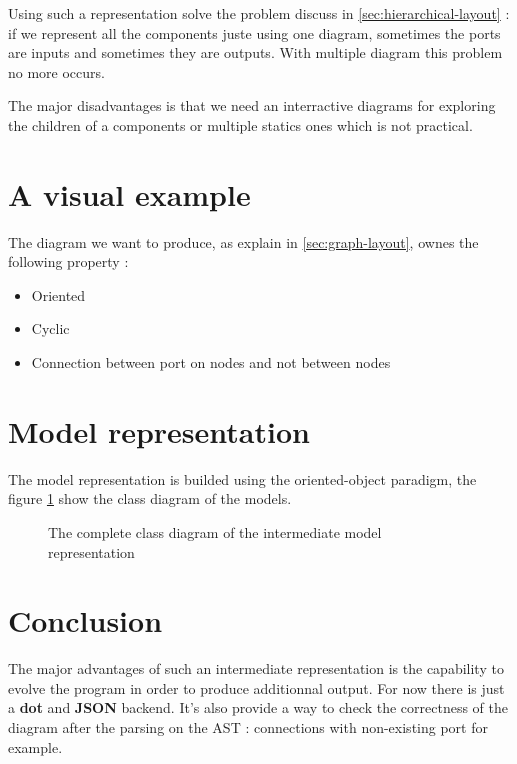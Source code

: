 Using such a representation solve the problem discuss in
\ref{sec:hierarchical-layout} : if we represent all the components juste using
one diagram, sometimes the ports are inputs and sometimes they are outputs. With
multiple diagram this problem no more occurs.

The major disadvantages is that we need an interractive diagrams for exploring
the children of a components or multiple statics ones which is not practical.

\section{A visual example}

The diagram we want to produce, as explain in \ref{sec:graph-layout}, ownes the following property :
\begin{itemize}
  \item Oriented
  \item Cyclic
  \item Connection between port on nodes and not between nodes
\end{itemize}

\section{Model representation}
\label{sec:model-representation} 

The model representation is builded using the oriented-object paradigm, the
figure \ref{fig:model-class-diagram} show the class diagram of the models.

\begin{figure}[H]
  \centering
  \caption[Class diagram of the intermediate model]{The complete class diagram of the intermediate model representation}
  \label{fig:model-class-diagram}
\end{figure}

\section{Conclusion}

The major advantages of such an intermediate representation is the capability to
evolve the program in order to produce additionnal output. For now there is just
a \textbf{dot} and \textbf{JSON} backend. It's also provide a way to check the
correctness of the diagram after the parsing on the AST : connections with
non-existing port for example.
